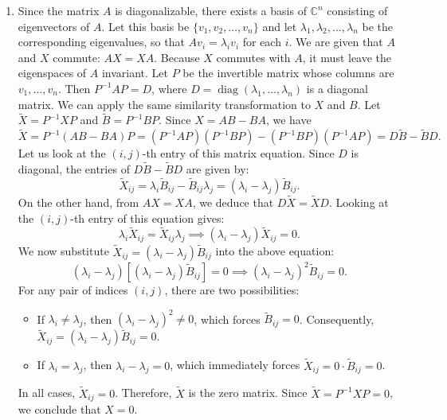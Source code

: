 \documentclass{article}
\begin{document}
\begin{enumerate}[label=\fbox{\arabic*}]
  \item %
        Since the matrix $A$ is diagonalizable, there exists a basis of $\mathbb{C}^n$ consisting of eigenvectors of $A$. Let this basis be $\{v_1, v_2, \dots, v_n\}$ and let $\lambda_1, \lambda_2, \dots, \lambda_n$ be the corresponding eigenvalues, so that $Av_i = \lambda_i v_i$ for each $i$.
        We are given that $A$ and $X$ commute: $AX = XA$. Because $X$ commutes with $A$, it must leave the eigenspaces of $A$ invariant. 
        Let $P$ be the invertible matrix whose columns are $v_1, \dots, v_n$. Then $P^{-1}AP = D$, where $D = \operatorname{diag}(\lambda_1, \dots, \lambda_n)$ is a diagonal matrix.
        We can apply the same similarity transformation to $X$ and $B$. Let $\tilde{X} = P^{-1}XP$ and $\tilde{B} = P^{-1}BP$. 
        Since $X = AB - BA$, we have
        \[
          \tilde{X} = P^{-1}(AB - BA)P = (P^{-1}AP)(P^{-1}BP) - (P^{-1}BP)(P^{-1}AP) = D\tilde{B} - \tilde{B}D.
        \]
        Let us look at the $(i, j)$-th entry of this matrix equation. Since $D$ is diagonal, the entries of $D\tilde{B} - \tilde{B}D$ are given by:
        \[
          \tilde{X}_{ij} = \lambda_i \tilde{B}_{ij} - \tilde{B}_{ij} \lambda_j = (\lambda_i - \lambda_j) \tilde{B}_{ij}.
        \]
        On the other hand, from $AX = XA$, we deduce that $D\tilde{X} = \tilde{X}D$. Looking at the $(i, j)$-th entry of this equation gives:
        \[
          \lambda_i \tilde{X}_{ij} = \tilde{X}_{ij} \lambda_j \implies (\lambda_i - \lambda_j) \tilde{X}_{ij} = 0.
        \]
        We now substitute $\tilde{X}_{ij} = (\lambda_i - \lambda_j) \tilde{B}_{ij}$ into the above equation:
        \[
          (\lambda_i - \lambda_j) [(\lambda_i - \lambda_j) \tilde{B}_{ij}] = 0 \implies (\lambda_i - \lambda_j)^2 \tilde{B}_{ij} = 0.
        \]
        For any pair of indices $(i, j)$, there are two possibilities:
        \begin{itemize}
          \item If $\lambda_i \neq \lambda_j$, then $(\lambda_i - \lambda_j)^2 \neq 0$, which forces $\tilde{B}_{ij} = 0$. Consequently, $\tilde{X}_{ij} = (\lambda_i - \lambda_j) \tilde{B}_{ij} = 0$.
          \item If $\lambda_i = \lambda_j$, then $\lambda_i - \lambda_j = 0$, which immediately forces $\tilde{X}_{ij} = 0 \cdot \tilde{B}_{ij} = 0$.
        \end{itemize}
        In all cases, $\tilde{X}_{ij} = 0$. Therefore, $\tilde{X}$ is the zero matrix. Since $\tilde{X} = P^{-1}XP = 0$, we conclude that $X = 0$.


\end{enumerate}
\end{document}
